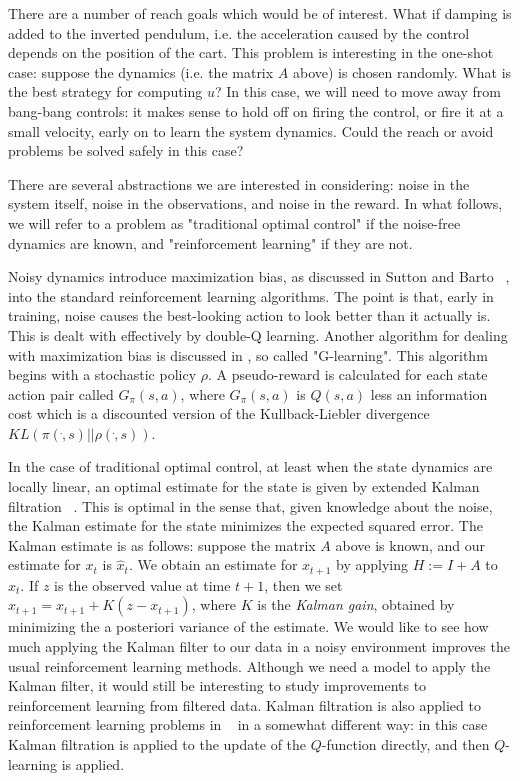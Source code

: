 \documentclass{article}
\begin{document}
There are a number of reach goals which would be of interest. What if damping is added to the inverted pendulum, i.e. the acceleration caused by the control depends on the position of the cart. This problem is interesting in the one-shot case: suppose the dynamics (i.e. the matrix $A$ above) is chosen randomly. What is the best strategy for computing $u$? In this case, we will need to move away from bang-bang controls: it makes sense to hold off on firing the control, or fire it at a small velocity, early on to learn the system dynamics. Could the reach or avoid problems be solved safely in this case?

There are several abstractions we are interested in considering: noise in the system itself, noise in the observations, and noise in the reward. In what follows, we will refer to a problem as "traditional optimal control" if the noise-free dynamics are known, and "reinforcement learning" if they are not. 

Noisy dynamics introduce maximization bias, as discussed in Sutton and Barto ~\cite{suttonAndBarto}, into the standard reinforcement learning algorithms. The point is that, early in training, noise causes the best-looking action to look better than it actually is. This is dealt with effectively by double-Q learning. Another algorithm for dealing with maximization bias is discussed in \cite{foxPakmanTishby}, so called "G-learning". This algorithm begins with a stochastic policy $\rho$. A pseudo-reward is calculated for each state action pair called $G_\pi(s,a)$, where $G_\pi(s,a)$ is $Q(s,a)$ less an information cost which is a discounted version of the Kullback-Liebler divergence $KL(\pi( \dot , s) || \rho( \dot , s))$.

In the case of traditional optimal control, at least when the state dynamics are locally linear, an  optimal estimate for the state is given by extended Kalman filtration ~\cite{welchBishop}. This is optimal in the sense that, given knowledge about the noise, the Kalman estimate for the state minimizes the expected squared error. The Kalman estimate is as follows: suppose the matrix $A$ above is known, and our estimate for $x_t$ is $\hat x_t$. We obtain an estimate for $x_{t+1}$ by applying $H := I+A$ to $\hat x_t$. If $z$ is the observed value at time $t+1$, then we set $\hat x_{t+1} = x_{t+1} + K (z - x_{t+1})$, where $K$ is the {\em Kalman gain}, obtained by minimizing the a posteriori variance of the estimate. We would like to see how much applying the Kalman filter to our data in a noisy environment improves the usual reinforcement learning methods. Although we need a model to apply the Kalman filter, it would still be interesting to study improvements to reinforcement learning from filtered data. Kalman filtration is also applied to reinforcement learning problems in ~\cite{trippSchacter} in a somewhat different way: in this case Kalman filtration is applied to the update of the $Q$-function directly, and then $Q$-learning is applied.
\end{document}
